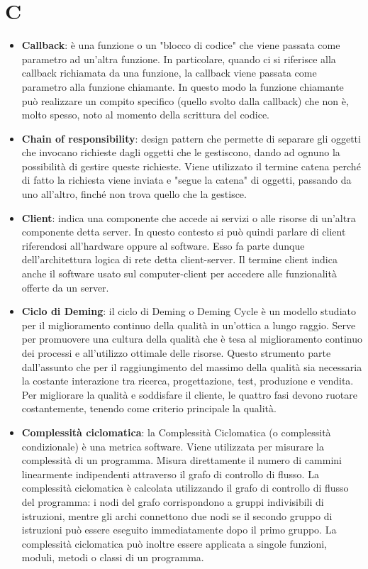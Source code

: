 \section{C}
\begin{itemize}
\item
	\textbf{Callback}: è una funzione o un "blocco di codice" che viene passata come parametro ad un'altra funzione. In particolare, quando ci si riferisce alla callback richiamata da una funzione, la callback viene passata come parametro alla funzione chiamante. In questo modo la funzione chiamante può realizzare un compito specifico (quello svolto dalla callback) che non è, molto spesso, noto al momento della scrittura del codice.
	\item
	\textbf{Chain of responsibility}: design pattern che permette di separare gli oggetti che invocano richieste dagli oggetti che le gestiscono, dando ad ognuno la possibilità di gestire queste richieste. Viene utilizzato il termine catena perché di fatto la richiesta viene inviata e "segue la catena" di oggetti, passando da uno all'altro, finché non trova quello che la gestisce.
	\item
	\textbf{Client}: indica una componente che accede ai servizi o alle risorse di un'altra componente detta server. In questo contesto si può quindi parlare di client riferendosi all'hardware oppure al software. Esso fa parte dunque dell'architettura logica di rete detta client-server.
Il termine client indica anche il software usato sul computer-client per accedere alle funzionalità offerte da un server.
	\item
	\textbf{Ciclo di Deming}: il ciclo di Deming o Deming Cycle è un modello studiato per il miglioramento continuo della qualità in un'ottica a lungo raggio. Serve per promuovere una cultura della qualità che è tesa al miglioramento continuo dei processi e all'utilizzo ottimale delle risorse. Questo strumento parte dall'assunto che per il raggiungimento del massimo della qualità sia necessaria la costante interazione tra ricerca, progettazione, test, produzione e vendita. Per migliorare la qualità e soddisfare il cliente, le quattro fasi devono ruotare costantemente, tenendo come criterio principale la qualità.
	\item
	\textbf{Complessità ciclomatica}: la Complessità Ciclomatica (o complessità condizionale) è una metrica software. Viene utilizzata per misurare la complessità di un programma. Misura direttamente il numero di cammini linearmente indipendenti attraverso il grafo di controllo di flusso. La complessità ciclomatica è calcolata utilizzando il grafo di controllo di flusso del programma: i nodi del grafo corrispondono a gruppi indivisibili di istruzioni, mentre gli archi connettono due nodi se il secondo gruppo di istruzioni può essere eseguito immediatamente dopo il primo gruppo. La complessità ciclomatica può inoltre essere applicata a singole funzioni, moduli, metodi o classi di un programma.

\end{itemize}
